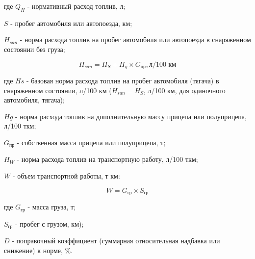 \documentclass[../nirs.tex]{subfiles}
\begin{document}
где $Q_H$ - нормативный расход топлив, л;

$S$ - пробег автомобиля или автопоезда, км;

$H_{san}$ - норма расхода топлив на пробег автомобиля или автопоезда в
снаряженном состоянии без груза;

\begin{equation*}
	H_{san} = H_S + H_g \times G_{\text{пр}}, \text{л/100 км}
\end{equation*}

где $Hs$ - базовая норма расхода топлив на пробег автомобиля (тягача) в
снаряженном состоянии, л/100 км ($H_{san} = H_S$, л/100 км, для одиночного
автомобиля, тягача);

$Hg$ - норма расхода топлив на дополнительную массу прицепа или полуприцепа,
л/100 ткм;

$G_{\text{пр}}$ - собственная масса прицепа или полуприцепа, т;

$H_W$ - норма расхода топлив на транспортную работу, л/100 ткм;

$W$ - объем транспортной работы, т км:

\begin{equation*}
	W = G_{\text{гр}} \times S_{\text{гр}}
\end{equation*}

где $G_{\text{гр}}$ - масса груза, т;

$S_{\text{гр}}$ - пробег с грузом, км);

$D$ - поправочный коэффициент (суммарная относительная надбавка или снижение) к
норме, \%.
\end{document}
